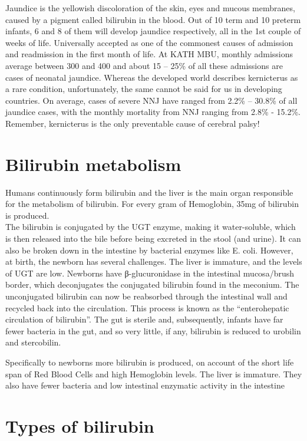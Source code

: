\documentclass[
  letterpaper,
  DIV=11,
  numbers=noendperiod]{scrreprt}
\begin{document}
Jaundice is the yellowish discoloration of the skin, eyes and mucous
membranes, caused by a pigment called bilirubin in the blood. Out of 10
term and 10 preterm infants, 6 and 8 of them will develop jaundice
respectively, all in the 1st couple of weeks of life. Universally
accepted as one of the commonest causes of admission and readmission in
the first month of life. At KATH MBU, monthly admissions average between
300 and 400 and about 15 -- 25\% of all these admissions are cases of
neonatal jaundice. Whereas the developed world describes kernicterus as
a rare condition, unfortunately, the same cannot be said for us in
developing countries. On average, cases of severe NNJ have ranged from
2.2\% -- 30.8\% of all jaundice cases, with the monthly mortality from
NNJ ranging from 2.8\% - 15.2\%. Remember, kernicterus is the only
preventable cause of cerebral palsy!

\hypertarget{bilirubin-metabolism}{%
\section{Bilirubin metabolism}\label{bilirubin-metabolism}}

Humans continuously form bilirubin and the liver is the main organ
responsible for the metabolism of bilirubin. For every gram of
Hemoglobin, 35mg of bilirubin is produced.\\
The bilirubin is conjugated by the UGT enzyme, making it water-soluble,
which is then released into the bile before being excreted in the stool
(and urine). It can also be broken down in the intestine by bacterial
enzymes like E. coli. However, at birth, the newborn has several
challenges. The liver is immature, and the levels of UGT are low.
Newborns have β-glucuronidase in the intestinal mucosa/brush border,
which deconjugates the conjugated bilirubin found in the meconium. The
unconjugated bilirubin can now be reabsorbed through the intestinal wall
and recycled back into the circulation. This process is known as the
``enterohepatic circulation of bilirubin''. The gut is sterile and,
subsequently, infants have far fewer bacteria in the gut, and so very
little, if any, bilirubin is reduced to urobilin and stercobilin.

Specifically to newborns more bilirubin is produced, on account of the
short life span of Red Blood Cells and high Hemoglobin levels. The liver
is immature. They also have fewer bacteria and low intestinal enzymatic
activity in the intestine

\hypertarget{types-of-bilirubin}{%
\section{Types of bilirubin}\label{types-of-bilirubin}}
\end{document}
